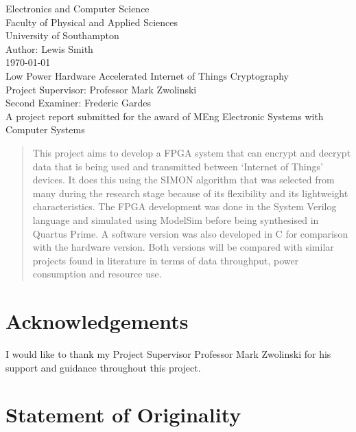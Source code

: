 \documentclass[12pt,twoside,a4paper]{report}
\begin{document}
    
	\begin{titlepage}
	\begin{center}
		\Huge
		Electronics and Computer Science
		\\Faculty of Physical and Applied Sciences
		\\University of Southampton
		\Large
		\\[4cm]Author: Lewis Smith
		\\[1cm]\today
		\\[2cm]Low Power Hardware Accelerated Internet of Things Cryptography
		\\[4cm]Project Supervisor: Professor Mark Zwolinski
		\\Second Examiner: Frederic Gardes
		\\[4cm]A project report submitted for the award of MEng Electronic Systems with Computer Systems
        
	\end{center}
	\end{titlepage}
	\thispagestyle{empty}
	\cleardoublepage
    
	\begin{abstract}
    
	This project aims to develop a FPGA system that can encrypt and decrypt data that is being used and transmitted between `Internet of Things' devices. It does this using the SIMON algorithm that was selected from many during the research stage because of its flexibility and its lightweight characteristics. The FPGA development was done in the System Verilog language and simulated using ModelSim before being synthesised in Quartus Prime. A software version was also developed in C for comparison with the hardware version. Both versions will be compared with similar projects found in literature in terms of data throughput, power consumption and resource use. 
    
	\end{abstract}
    
	\tableofcontents
	\newpage
    
	\section*{Acknowledgements}
	I would like to thank my Project Supervisor Professor Mark Zwolinski for his support and guidance throughout this project.
	
	\section*{Statement of Originality}
    
\end{document}
